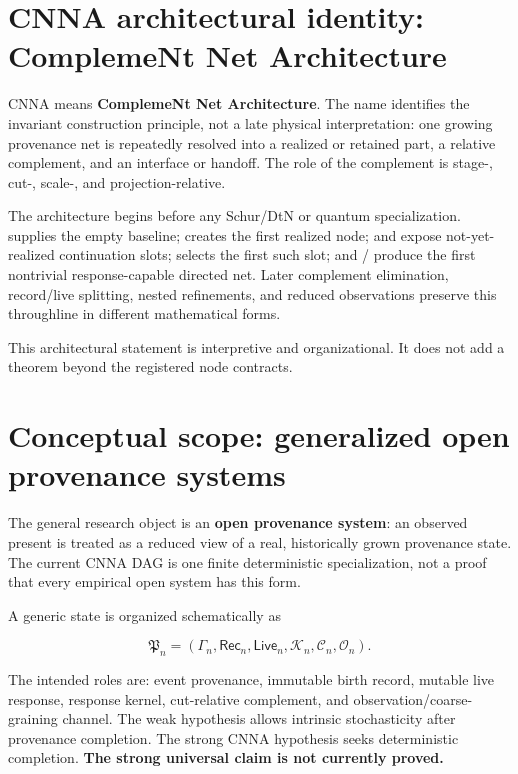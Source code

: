 \section{CNNA architectural identity: ComplemeNt Net
Architecture}\label{cnna-architectural-identity-complement-net-architecture}

CNNA means \textbf{ComplemeNt Net Architecture}. The name identifies the
invariant construction principle, not a late physical interpretation:
one growing provenance net is repeatedly resolved into a realized or
retained part, a relative complement, and an interface or handoff. The
role of the complement is stage-, cut-, scale-, and projection-relative.

The architecture begins before any Schur/DtN or quantum specialization.
\texttt{\protect{}} supplies the empty baseline; \texttt{\protect{}} creates the
first realized node; \texttt{\protect{}} and \texttt{\protect{}} expose
not-yet-realized continuation slots; \texttt{\protect{}} selects the first
such slot; and \texttt{\protect{}}/\texttt{\protect{}} produce the first nontrivial
response-capable directed net. Later complement elimination, record/live
splitting, nested refinements, and reduced observations preserve this
throughline in different mathematical forms.

This architectural statement is interpretive and organizational. It does
not add a theorem beyond the registered node contracts.

\section{Conceptual scope: generalized open provenance
systems}\label{conceptual-scope-generalized-open-provenance-systems}

The general research object is an \textbf{open provenance system}: an
observed present is treated as a reduced view of a real, historically
grown provenance state. The current CNNA DAG is one finite deterministic
specialization, not a proof that every empirical open system has this
form.

A generic state is organized schematically as

\[
\mathfrak P_n=(\Gamma_n,\mathsf{Rec}_n,\mathsf{Live}_n,\mathcal K_n,\mathcal C_n,\mathcal O_n).
\]

The intended roles are: event provenance, immutable birth record,
mutable live response, response kernel, cut-relative complement, and
observation/coarse-graining channel. The weak hypothesis allows
intrinsic stochasticity after provenance completion. The strong CNNA
hypothesis seeks deterministic completion. \textbf{The strong universal
claim is not currently proved.}

